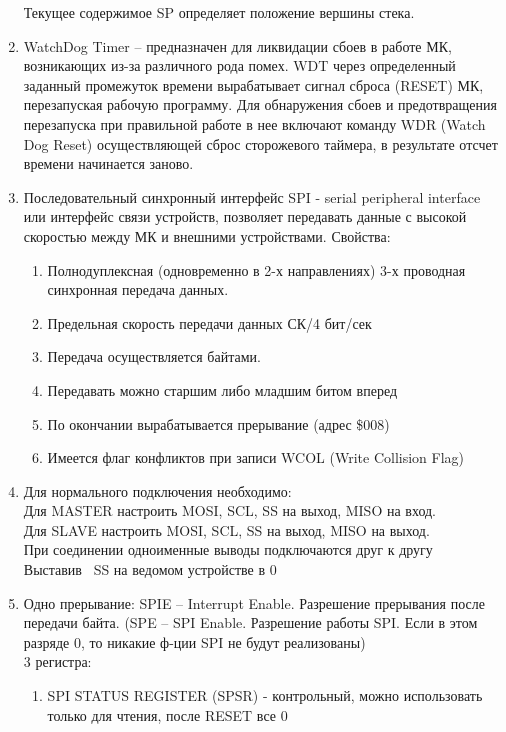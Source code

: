 \documentclass{article}
\begin{document}
\begin{enumerate}
Текущее содержимое SP определяет положение вершины стека. 
		\item WatchDog Timer – предназначен для ликвидации сбоев в работе МК, возникающих из-за различного рода помех. WDT через определенный заданный промежуток времени вырабатывает сигнал сброса (RESET) МК, перезапуская рабочую программу. Для обнаружения сбоев и предотвращения перезапуска при правильной работе в нее включают команду WDR (Watch Dog Reset) осуществляющей сброс сторожевого таймера, в результате отсчет времени начинается заново. 
		\item Последовательный синхронный интерфейс SPI - serial peripheral interface или интерфейс связи устройств, позволяет передавать данные с высокой скоростью между МК и внешними устройствами. Свойства:
		\begin{enumerate}
			\item Полнодуплексная (одновременно в 2-х направлениях) 3-х проводная синхронная передача данных. 
			\item Предельная скорость передачи данных СК/4 бит/сек 
			\item Передача осуществляется байтами.
			\item Передавать можно старшим либо младшим битом вперед  
			\item По окончании вырабатывается прерывание (адрес \$008) 
			\item Имеется флаг конфликтов при записи WCOL (Write Collision Flag) 
		\end{enumerate}		  
		\item Для нормального подключения необходимо:  \\
Для MASTER настроить MOSI, SCL, SS на выход, MISO на вход. \\  
Для SLAVE настроить MOSI, SCL, SS на выход, MISO на выход. \\  
При соединении одноименные выводы подключаются друг к другу \\
Выставив ~SS на ведомом устройстве в 0 
\begin{figure}[h!]
\end{figure}
		\item Одно прерывание: SPIE – Interrupt Enable. Разрешение прерывания после передачи байта. (SPE – SPI Enable. Разрешение работы SPI. Если в этом разряде 0, то никакие ф-ции SPI не будут реализованы) \\ 
		3 регистра: 
		\begin{enumerate}
			\item SPI STATUS REGISTER (SPSR) - контрольный, можно использовать только для чтения, после RESET все 0 

\end{enumerate}
\end{enumerate}
\end{document}
